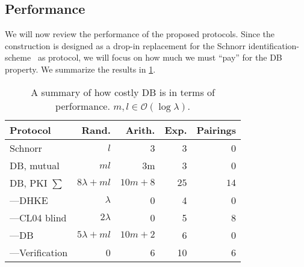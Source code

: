 \subsection{Performance}%
\label{performance}


We will now review the performance of the proposed protocols.
Since the construction is designed as a drop-in replacement for the Schnorr 
identification-scheme~\cite{Schnorr} as  protocol, we will focus on 
how much we must \enquote{pay} for the \ac{DB} property.
We summarize the results in \cref{performance-overview}.

\begin{frame}
  \begin{table}
    \caption{%
      A summary of how costly \acl*{DB} is in terms of performance.
      \(m, l\in \mathcal{O}(\log \lambda)\).
    }\label{performance-overview}
    \begin{tabular}{lrrrr}
      \toprule
      Protocol
      & Rand.
      & Arith.
      & Exp.
      & Pairings\\
      \midrule
      Schnorr             & \(l\)             & 3    & 3      & 0\\
      DB, mutual          & \(ml\)            & 3m   & 3      & 0\\
      DB, \acs*{PKI} \(\sum\)
                          & \(8\lambda + ml\)
                          & \(10m+8\)
                          & \(25\)
                          & \(14\)\\
      ---\acs*{DHKE}      & \(\lambda\)       & 0    & 4      & 0\\
      ---CL04 blind       & \(2\lambda\)      & 0    & 5      & 8\\
      ---DB               & \(5\lambda + ml\)    & \(10m + 2\) & 6 & 0\\
      ---Verification     & 0    & 6 & 10 & 6\\
      \bottomrule
    \end{tabular}
  \end{table}
\end{frame}

